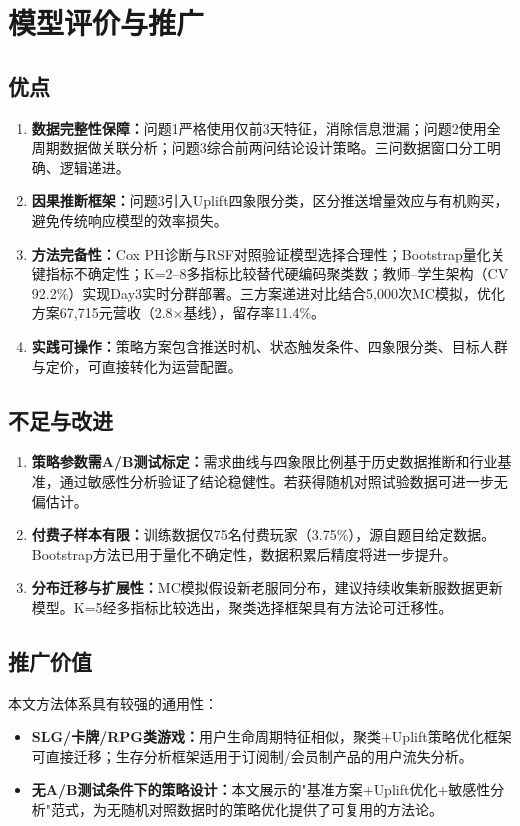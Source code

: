 \section{模型评价与推广}

\subsection{优点}

\begin{enumerate}
    \item \textbf{数据完整性保障：}问题1严格使用仅前3天特征，消除信息泄漏；问题2使用全周期数据做关联分析；问题3综合前两问结论设计策略。三问数据窗口分工明确、逻辑递进。
    \item \textbf{因果推断框架：}问题3引入Uplift四象限分类，区分推送增量效应与有机购买，避免传统响应模型的效率损失。
    \item \textbf{方法完备性：}Cox PH诊断与RSF对照验证模型选择合理性；Bootstrap量化关键指标不确定性；K=2--8多指标比较替代硬编码聚类数；教师--学生架构（CV 92.2\%）实现Day3实时分群部署。三方案递进对比结合5,000次MC模拟，优化方案67,715元营收（2.8$\times$基线），留存率11.4\%。
    \item \textbf{实践可操作：}策略方案包含推送时机、状态触发条件、四象限分类、目标人群与定价，可直接转化为运营配置。
\end{enumerate}

\subsection{不足与改进}

\begin{enumerate}
    \item \textbf{策略参数需A/B测试标定：}需求曲线与四象限比例基于历史数据推断和行业基准，通过敏感性分析验证了结论稳健性。若获得随机对照试验数据可进一步无偏估计。
    \item \textbf{付费子样本有限：}训练数据仅75名付费玩家（3.75\%），源自题目给定数据。Bootstrap方法已用于量化不确定性，数据积累后精度将进一步提升。
    \item \textbf{分布迁移与扩展性：}MC模拟假设新老服同分布，建议持续收集新服数据更新模型。K=5经多指标比较选出，聚类选择框架具有方法论可迁移性。
\end{enumerate}

\subsection{推广价值}

本文方法体系具有较强的通用性：
\begin{itemize}
    \item \textbf{SLG/卡牌/RPG类游戏\cite{pape2024}：}用户生命周期特征相似，聚类$+$Uplift策略优化框架可直接迁移；生存分析框架适用于订阅制/会员制产品的用户流失分析。
    \item \textbf{无A/B测试条件下的策略设计：}本文展示的"基准方案$+$Uplift优化$+$敏感性分析"范式，为无随机对照数据时的策略优化提供了可复用的方法论。
\end{itemize}
